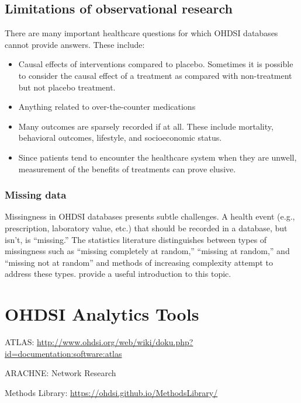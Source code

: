 \documentclass[11pt]{book}
\providecommand{\tightlist}{%
  \setlength{\itemsep}{0pt}\setlength{\parskip}{0pt}}
\begin{document}
\section{Limitations of observational
research}\label{limitations-of-observational-research}

There are many important healthcare questions for which OHDSI databases
cannot provide answers. These include:

\begin{itemize}
\tightlist
\item
  Causal effects of interventions compared to placebo. Sometimes it is
  possible to consider the causal effect of a treatment as compared with
  non-treatment but not placebo treatment.
\item
  Anything related to over-the-counter medications
\item
  Many outcomes are sparsely recorded if at all. These include
  mortality, behavioral outcomes, lifestyle, and socioeconomic status.
\item
  Since patients tend to encounter the healthcare system when they are
  unwell, measurement of the benefits of treatments can prove elusive.
\end{itemize}

\subsection{Missing data}\label{missing-data}

Missingness in OHDSI databases presents subtle challenges. A health
event (e.g., prescription, laboratory value, etc.) that should be
recorded in a database, but isn't, is ``missing.'' The statistics
literature distinguishes between types of missingness such as ``missing
completely at random,'' ``missing at random,'' and ``missing not at
random'' and methods of increasing complexity attempt to address these
types. \citet{perkins2017principled} provide a useful introduction to
this topic.

\chapter{OHDSI Analytics Tools}\label{OhdsiAnalyticsTools}

ATLAS:
\url{http://www.ohdsi.org/web/wiki/doku.php?id=documentation:software:atlas}

ARACHNE: Network Research

Methods Library: \url{https://ohdsi.github.io/MethodsLibrary/}
\end{document}

